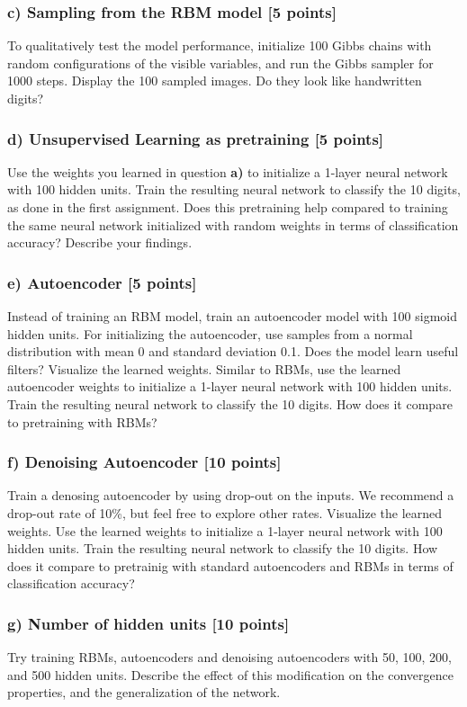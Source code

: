 \documentclass[10pt]{article}
\begin{document}
\subsubsection*{c) Sampling from the RBM model [5 points]}
To qualitatively test the model performance, initialize 100 Gibbs chains 
with random configurations of the visible variables, and run the Gibbs sampler 
for 1000 steps. Display the 100 sampled images. Do they look like handwritten digits?

\subsubsection*{d) Unsupervised Learning as pretraining [5 points]}
Use the weights you learned in question \textbf{a)} to initialize a 1-layer neural network with 100 hidden units. 
Train the resulting neural network to classify the 10 digits, as done in the first 
assignment. Does this pretraining help compared to training the same 
neural network initialized with random weights in terms of 
classification accuracy? Describe your findings.  

\subsubsection*{e) Autoencoder [5 points]}
Instead of training an RBM model, train an autoencoder model
with 100 sigmoid hidden units. For initializing the autoencoder, use samples from a normal distribution with mean 0 and standard deviation 0.1. 
Does the model learn useful filters? Visualize the learned weights.
Similar to RBMs, use the learned autoencoder 
weights to initialize a 1-layer neural network with 100 hidden units. 
Train the resulting neural network to classify the 10 digits.
How does it compare to pretraining with RBMs?
 

\subsubsection*{f) Denoising Autoencoder [10 points]}
Train a denosing autoencoder by using drop-out on the inputs. We recommend a drop-out rate of 10\%, but feel free to explore other rates.
Visualize the learned weights. Use the learned 
weights to initialize a 1-layer neural network with 100 hidden units.
Train the resulting neural network to classify the 10 digits.
How does it compare to pretrainig with standard autoencoders and RBMs
in terms of classification accuracy?


\subsubsection*{g) Number of hidden units [10 points]}
Try training RBMs, autoencoders and denoising autoencoders with 
50, 100, 200, and 500  hidden units.
Describe the effect of this modification on the convergence properties, and the
generalization of the network.
\end{document}
